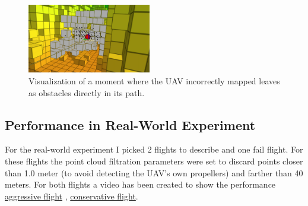            \begin{figure}[htbp]
                \centering
                \includegraphics[width=0.48\textwidth]{./fig/rviz/deadlock_moment_mapping_gray.png}
                \caption{
                    Visualization of a moment where the \ac{UAV} incorrectly mapped leaves as obstacles directly in its path. 
                }
                \label{fig:map_fail}
            \end{figure}

        
        \subsection{Performance in Real-World Experiment}
            For the real-world experiment I picked 2 flights to describe and one fail flight. 
            For these flights the point cloud filtration parameters were set to discard points closer than 1.0 meter (to avoid detecting the \ac{UAV}'s own propellers) and farther than 40 meters.
            For both flights a video has been created to show the performance \href{https://www.youtube.com/watch?v=DFt222gnA_w&ab_channel=MichalKamler}{aggressive flight} \cite{aggressive_flight}, \href{https://www.youtube.com/watch?v=AJPk0yVCPUo&ab_channel=MichalKamler}{conservative flight}\cite{conservative_flight}.
            
